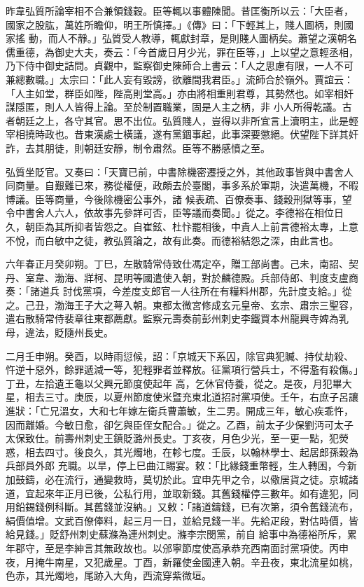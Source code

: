 \begin{pinyinscope}
 昨韋弘質所論宰相不合兼領錢穀。臣等輒以事體陳聞。昔匡衡所以云：「大臣者，國家之股肱，萬姓所瞻仰，明王所慎擇。」《傳》曰：「下輕其上，賤人圖柄，則國家搖
 動，而人不靜。」弘質受人教導，輒獻封章，是則賤人圖柄矣。蕭望之漢朝名儒重德，為御史大夫，奏云：「今首歲日月少光，罪在臣等，」上以望之意輕丞相，乃下侍中御史詰問。貞觀中，監察御史陳師合上書云：「人之思慮有限，一人不可兼總數職。」太宗曰：「此人妄有毀謗，欲離間我君臣。」流師合於嶺外。賈誼云：「人主如堂，群臣如陛，陛高則堂高。」亦由將相重則君尊，其勢然也。如宰相奸謀隱匿，則人人皆得上論。至於制置職業，固是人主之柄，非
 小人所得乾議。古者朝廷之上，各守其官。思不出位。弘質賤人，豈得以非所宜言上瀆明主，此是輕宰相撓時政也。昔東漢處士橫議，遂有黨錮事起，此事深要懲絕。伏望陛下詳其奸詐，去其朋徒，則朝廷安靜，制令肅然。臣等不勝感憤之至。



 弘質坐貶官。又奏曰：「天寶已前，中書除機密遷授之外，其他政事皆與中書舍人同商量。自艱難已來，務從權便，政頗去於臺閣，事多系於軍期，決遣萬機，不暇博議。臣等商量，今後除機密公事外，諸
 候表疏、百僚奏事、錢穀刑獄等事，望令中書舍人六人，依故事先參詳可否，臣等議而奏聞。」從之。李德裕在相位日久，朝臣為其所抑者皆怨之。自崔鉉、杜忭罷相後，中貴人上前言德裕太專，上意不悅，而白敏中之徒，教弘質論之，故有此奏。而德裕結怨之深，由此言也。



 六年春正月癸卯朔。丁巳，左散騎常侍致仕馮定卒，贈工部尚書。己未，南詔、契丹、室韋、渤海、牂柯、昆明等國遣使入朝，對於麟德殿。兵部侍郎、判度支盧商奏：「諸道兵
 討伐黨項，今差度支郎官一人往所在有糧料州郡，先計度支給。」從之。己丑，渤海王子大之萼入朝。東都太微宮修成玄元皇帝、玄宗、肅宗三聖容，遣右散騎常侍裴章往東都薦獻。監察元壽奏前彭州刺史李鐵買本州龍興寺婢為乳母，違法，貶隨州長史。



 二月壬申朔。癸酉，以時雨愆候，詔：「京城天下系囚，除官典犯贓、持仗劫殺、忤逆十惡外，餘罪遞減一等，犯輕罪者並釋放。征黨項行營兵士，不得濫有殺傷。」丁丑，左拾遺王龜以父興元節度使起年
 高，乞休官侍養，從之。是夜，月犯畢大星，相去三寸。庚辰，以夏州節度使米暨充東北道招討黨項使。壬午，右庶子呂讓進狀：「亡兄溫女，大和七年嫁左衛兵曹蕭敏，生二男。開成三年，敏心疾乖忤，因而離婚。今敏日愈，卻乞與臣侄女配合。」從之。乙酉，前太子少保劉沔可太子太保致仕。前壽州刺史王鎮貶潞州長史。丁亥夜，月色少光，至一更一點，犯熒惑，相去四寸。後良久，其光燭地，在軫七度。壬辰，以翰林學士、起居郎孫穀為兵部員外郎
 充職。以旱，停上巳曲江賜宴。敕：「比緣錢重幣輕，生人轉困，今新加鼓鑄，必在流行，通變救時，莫切於此。宜申先甲之令，以儆居貨之徒。京城諸道，宜起來年正月已後，公私行用，並取新錢。其舊錢權停三數年。如有違犯，同用鉛錫錢例科斷。其舊錢並沒納。」又敕：「諸道鑄錢，已有次第，須令舊錢流布，絹價值增。文武百僚俸料，起三月一日，並給見錢一半。先給疋段，對估時價，皆給見錢。」貶舒州刺史蘇滌為連州刺史。滌李宗閔黨，前自
 給事中為德裕所斥，累年郡守，至是李紳言其無政故也。以邠寧節度使高承恭充西南面討黨項使。丙申夜，月掩牛南星，又犯歲星。丁酉，新羅使金國連入朝。辛丑夜，東北流星如桃，色赤，其光燭地，尾跡入大角，西流穿紫微垣。




\end{pinyinscope}
